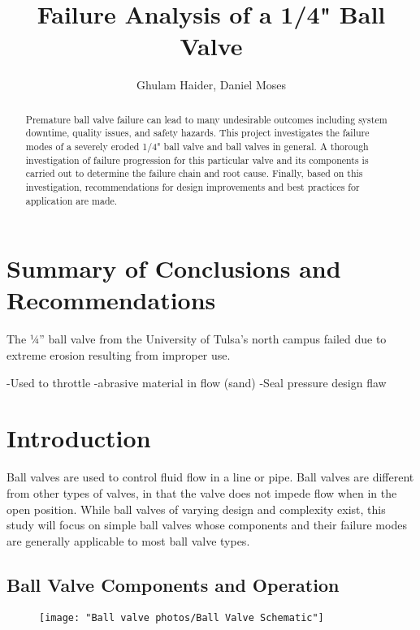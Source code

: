 \documentclass[]{article}
\title{Failure Analysis of a 1/4" Ball Valve}
\author{Ghulam Haider, Daniel Moses}
\begin{document}
\maketitle

\begin{abstract}
	
	Premature ball valve failure can lead to many undesirable outcomes including system downtime, quality issues, and safety hazards. This project investigates the failure modes of a severely eroded 1/4" ball valve and ball valves in general. A thorough investigation of failure progression for this particular valve and its components is carried out to determine the failure chain and root cause. Finally, based on this investigation, recommendations for design improvements and best practices for application are made.
	

\end{abstract}
\tableofcontents
\pagebreak
\section{Summary of Conclusions and Recommendations}
The ¼” ball valve from the University of Tulsa’s north campus failed due to extreme erosion resulting from improper use.

-Used to throttle
-abrasive material in flow (sand)
-Seal pressure design flaw

\section{Introduction}
Ball valves are used to control fluid flow in a line or pipe. Ball valves are different from other types of valves, in that the valve does not impede flow when in the open position. While ball valves of varying design and complexity exist, this study will focus on simple ball valves whose components and their failure modes are generally applicable to most ball valve types.

\subsection{Ball Valve Components and Operation}
\begin{figure}[htbp]
	\centering
	\texttt{[image: "Ball valve photos/Ball Valve Schematic"]}
	\caption[Simple Ball Valve Schematic (Muller Industries)]{}
	\caption{}
	\label{fig:ball-valve-schematic}
\end{figure}
\end{document}
